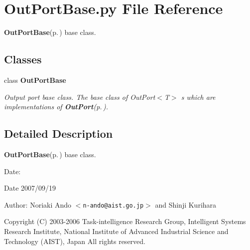 \section{Out\-Port\-Base.py File Reference}
\label{OutPortBase_8py}
{\bf Out\-Port\-Base}{\rm (p.\,\pageref{classOutPortBase})} base class. 

\subsection*{Classes}
\begin{CompactItemize}
\item 
class {\bf Out\-Port\-Base}
\begin{CompactList}\small\item\em Output port base class. The base class of Out\-Port$<$T$>$ s which are implementations of {\bf Out\-Port}{\rm (p.\,\pageref{classOutPort})}. \item\end{CompactList}\end{CompactItemize}


\subsection{Detailed Description}
{\bf Out\-Port\-Base}{\rm (p.\,\pageref{classOutPortBase})} base class. 

\begin{Desc}
\item[Date:]\begin{Desc}
\item[Date]2007/09/19 \end{Desc}
\end{Desc}
\begin{Desc}
\item[Author:]Noriaki Ando $<${\tt n-ando@aist.go.jp}$>$ and Shinji Kurihara\end{Desc}
Copyright (C) 2003-2006 Task-intelligence Research Group, Intelligent Systems Research Institute, National Institute of Advanced Industrial Science and Technology (AIST), Japan All rights reserved.